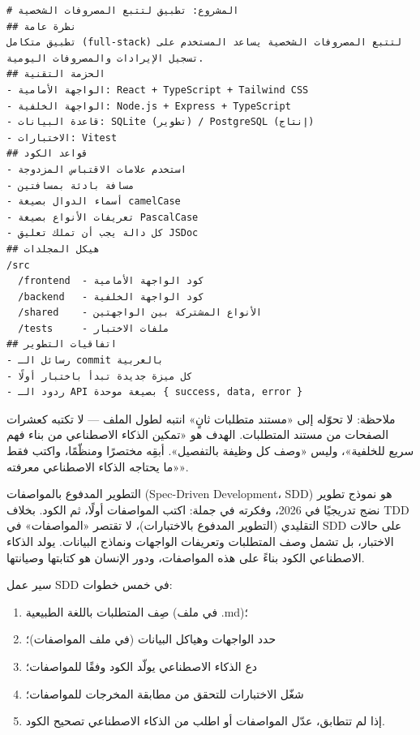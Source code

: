 \begin{lstlisting}
# المشروع: تطبيق لتتبع المصروفات الشخصية
## نظرة عامة
تطبيق متكامل (full-stack) لتتبع المصروفات الشخصية يساعد المستخدم على تسجيل الإيرادات والمصروفات اليومية.
## الحزمة التقنية
- الواجهة الأمامية: React + TypeScript + Tailwind CSS
- الواجهة الخلفية: Node.js + Express + TypeScript
- قاعدة البيانات: SQLite (تطوير) / PostgreSQL (إنتاج)
- الاختبارات: Vitest
## قواعد الكود
- استخدم علامات الاقتباس المزدوجة
- مسافة بادئة بمسافتين
- أسماء الدوال بصيغة camelCase
- تعريفات الأنواع بصيغة PascalCase
- كل دالة يجب أن تملك تعليق JSDoc
## هيكل المجلدات
/src
  /frontend  - كود الواجهة الأمامية
  /backend   - كود الواجهة الخلفية
  /shared    - الأنواع المشتركة بين الواجهتين
  /tests     - ملفات الاختبار
## اتفاقيات التطوير
- رسائل الـ commit بالعربية
- كل ميزة جديدة تبدأ باختبار أولًا
- ردود الـ API بصيغة موحدة { success, data, error }
\end{lstlisting}

\begin{tcbwarn}{ملاحظة: لا تحوّله إلى «مستند متطلبات ثانٍ»}
انتبه لطول الملف — لا تكتبه كعشرات الصفحات من مستند المتطلبات. الهدف هو «تمكين الذكاء الاصطناعي من بناء فهم سريع للخلفية»، وليس «وصف كل وظيفة بالتفصيل». أبقِه مختصرًا ومنظّمًا، واكتب فقط «ما يحتاجه الذكاء الاصطناعي معرفته».

\end{tcbwarn}


التطوير المدفوع بالمواصفات (Spec-Driven Development، SDD) هو نموذج تطوير نضج تدريجيًا في 2026، وفكرته في جملة: اكتب المواصفات أولًا، ثم الكود. بخلاف TDD التقليدي (التطوير المدفوع بالاختبارات)، لا تقتصر «المواصفات» في SDD على حالات الاختبار، بل تشمل وصف المتطلبات وتعريفات الواجهات ونماذج البيانات. يولد الذكاء الاصطناعي الكود بناءً على هذه المواصفات، ودور الإنسان هو كتابتها وصيانتها.

سير عمل SDD في خمس خطوات:

\begin{enumerate}
  \item صِف المتطلبات باللغة الطبيعية (في ملف .md)؛
  \item حدد الواجهات وهياكل البيانات (في ملف المواصفات)؛
  \item دع الذكاء الاصطناعي يولّد الكود وفقًا للمواصفات؛
  \item شغّل الاختبارات للتحقق من مطابقة المخرجات للمواصفات؛
  \item إذا لم تتطابق، عدّل المواصفات أو اطلب من الذكاء الاصطناعي تصحيح الكود.
\end{enumerate}


